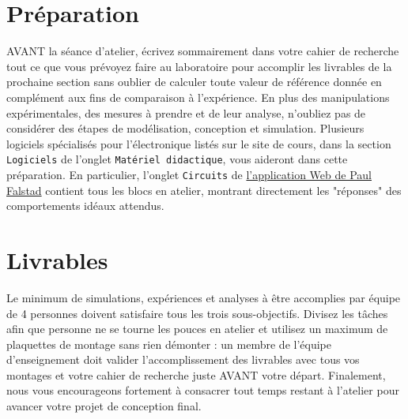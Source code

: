 \documentclass[canadien,12pt,oneside,letterpaper]{article}
\begin{document}
\section{Préparation}\label{sec:prep}
\vspace{-2ex}
AVANT la séance d'atelier, écrivez sommairement dans votre cahier de recherche tout ce que vous prévoyez faire au laboratoire pour accomplir les livrables de la prochaine section sans oublier de calculer toute valeur de référence donnée en complément aux fins de comparaison à l'expérience. En plus des manipulations expérimentales, des mesures à prendre et de leur analyse, n'oubliez pas de considérer des étapes de modélisation, conception et simulation. Plusieurs logiciels spécialisés pour l'électronique listés sur le site de cours, dans la section \texttt{Logiciels} de l'onglet \texttt{Matériel didactique}, vous aideront dans cette préparation. En particulier, l'onglet \texttt{Circuits} de \href{https://www.falstad.com/circuit/}{l'application Web de Paul Falstad} contient tous les blocs en atelier, montrant directement les "réponses" des comportements idéaux attendus. 

\vspace{-2ex}
\section{Livrables}\label{sec:livrables}
\vspace{-2ex}
Le minimum de simulations, expériences et analyses à être accomplies par équipe de 4 personnes doivent satisfaire tous les trois sous-objectifs. Divisez les tâches afin que personne ne se tourne les pouces en atelier et utilisez un maximum de plaquettes de montage sans rien démonter : un membre de l'équipe d'enseignement doit valider l'accomplissement des livrables avec tous vos montages et votre cahier de recherche juste AVANT votre départ. Finalement, nous vous encourageons fortement à consacrer tout temps restant à l'atelier pour avancer votre projet de conception final.


\end{document}
